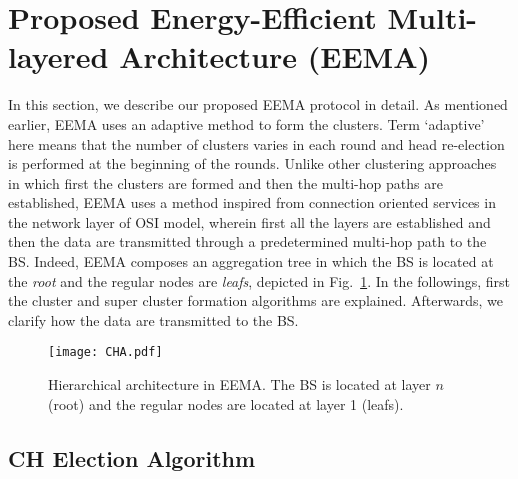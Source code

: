 \documentclass[journal]{IEEEtran}
\begin{document}
\section{Proposed Energy-Efficient Multi-layered Architecture (EEMA)}
\label{sec:EEMA}
In this section, we describe our proposed EEMA protocol in detail. As mentioned earlier, EEMA uses an adaptive method to form the clusters.  Term `adaptive' here means that the number of clusters varies in each round and head re-election is performed at the beginning of the rounds.
Unlike other clustering approaches in which first the clusters are formed and then the multi-hop paths are established, EEMA uses a method inspired from connection oriented services in the network layer of OSI model, wherein first all the layers are established and then the data are transmitted through a predetermined multi-hop path to the BS.  Indeed, EEMA composes an aggregation tree in which the BS is located at the {\it root} and the regular nodes are {\it leafs}, depicted in Fig.~\ref{fig:CHA}.   In the followings, first the cluster and super cluster formation algorithms are explained. Afterwards, we clarify how the data are transmitted to the BS. 


\begin{figure}[h]
\centering
\texttt{[image: CHA.pdf]}
\caption{Hierarchical architecture in EEMA. The BS is located at layer $n$ (root) and the regular nodes are located at layer 1 (leafs).}
\label{fig:CHA}
\end{figure}
 
\subsection{CH Election Algorithm}
\label{subsec:CH-el}
\end{document}

